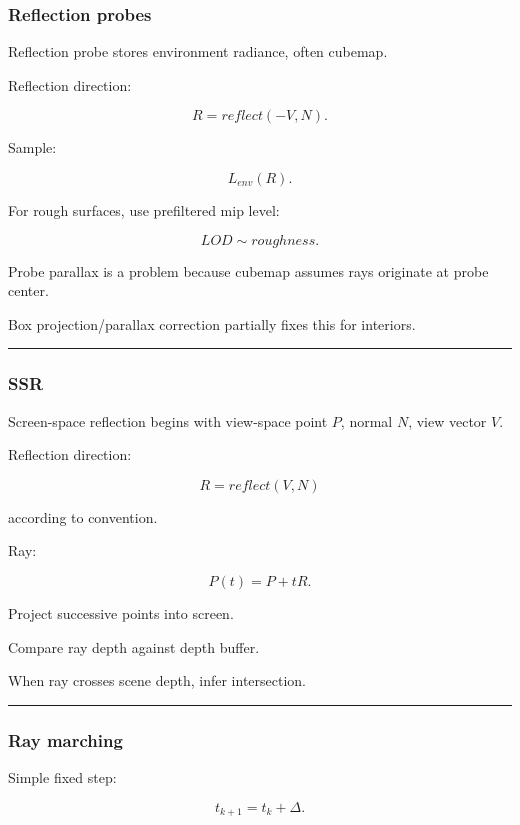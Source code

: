 \subsubsection{Reflection probes}\label{reflection-probes}

Reflection probe stores environment radiance, often cubemap.

Reflection direction:

\[
R=
reflect(-V,N).
\]

Sample:

\[
L_{env}(R).
\]

For rough surfaces, use prefiltered mip level:

\[
LOD
\sim
roughness.
\]

Probe parallax is a problem because cubemap assumes rays originate at probe center.

Box projection/parallax correction partially fixes this for interiors.

\begin{center}\rule{0.5\linewidth}{0.5pt}\end{center}

\subsubsection{SSR}\label{ssr}

Screen-space reflection begins with view-space point \(P\), normal \(N\), view vector \(V\).

Reflection direction:

\[
R=
reflect(V,N)
\]

according to convention.

Ray:

\[
P(t)=P+tR.
\]

Project successive points into screen.

Compare ray depth against depth buffer.

When ray crosses scene depth, infer intersection.

\begin{center}\rule{0.5\linewidth}{0.5pt}\end{center}

\subsubsection{Ray marching}\label{ray-marching}

Simple fixed step:

\[
t_{k+1}=t_k+\Delta.
\]

